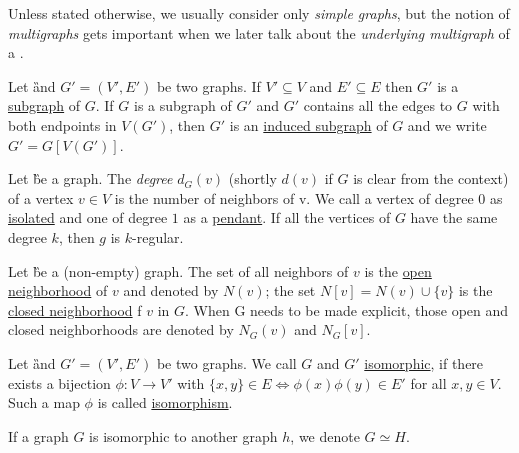 Unless stated otherwise, we usually consider only \textit{simple graphs}, but the notion of \textit{multigraphs} gets important when we later talk about the \textit{underlying multigraph} of a \dreg. 

\begin{definition}
    Let \G and $G' = (V', E')$ be two graphs. If $V' \subseteq V$ and $E' \subseteq E$ then $G'$ is a \underline{subgraph} of $G$. 
    If $G$ is a subgraph of $G'$ and $G'$ contains all the edges to $G$ with both endpoints in $V(G')$, then $G'$ is an \underline{induced subgraph} of $G$ and we write $G' = G[V(G')]$.
\end{definition}


\begin{definition}[Degrees]
    Let \G be a graph. The \textit{degree} $d_G(v)$ (shortly $d(v)$ if $G$ is clear from the context) of a vertex $v \in V$ is the number of neighbors of v. We call a vertex of degree $0$ as \underline{isolated} and one of degree $1$ as a \underline{pendant}. If all the vertices of $G$ have the same degree $k$, then $g$ is $k$-regular.
\end{definition}

\begin{definition}
    Let \G be a (non-empty) graph. 
    The set of all neighbors of $v$ is the \underline{open neighborhood} of $v$ and denoted by $N(v)$; the set $N[v] = N(v) \cup \{v\}$ is the \underline{closed neighborhood} f $v$ in $G$. When G needs to be made explicit, those open and closed neighborhoods are denoted by $N_G(v)$ and $N_G[v]$. 
\end{definition}

\begin{definition}
Let \G and $G' = (V', E')$ be two graphs. We call $G$ and $G'$ \underline{isomorphic}, if there exists a bijection $\phi: V \rightarrow V'$ with $\{x, y\} \in E \Leftrightarrow \phi(x)\phi(y) \in E'$ for all  $x,y \in V$. Such a map $\phi$ is called \underline{isomorphism}.

If a graph $G$ is isomorphic to another graph $h$, we denote $G \simeq H$. 
\end{definition}

